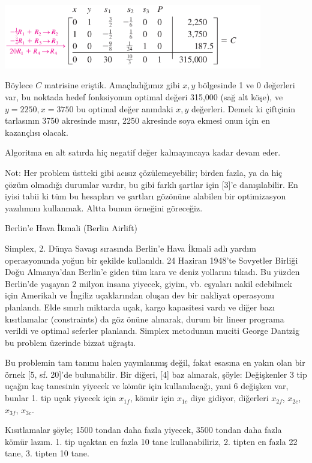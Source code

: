 \documentclass[12pt,fleqn]{article}\usepackage{../../common}
\begin{document}
\includegraphics[height=2.8cm]{func_simplex_08.png}

Böylece $C$ matrisine eriştik. Amaçladığımız gibi $x,y$ bölgesinde 1 ve 0
değerleri var, bu noktada hedef fonksiyonun optimal değeri 315,000 (sağ alt
köşe), ve $y=2250, x=3750$ bu optimal değer anındaki $x,y$ değerleri. Demek ki
çiftçinin tarlasının 3750 akresinde mısır, 2250 akresinde soya ekmesi onun için
en kazançlısı olacak.

Algoritma en alt satırda hiç negatif değer kalmayıncaya kadar devam eder. 

Not: Her problem üstteki gibi acısız çözülemeyebilir; birden fazla, ya da hiç
çözüm olmadığı durumlar vardır, bu gibi farklı şartlar için [3]'e
danışılabilir. En iyisi tabii ki tüm bu hesapları ve şartları gözönüne alabilen
bir optimizasyon yazılımını kullanmak. Altta bunun örneğini göreceğiz.

Berlin'e Hava İkmali (Berlin Airlift)

Simplex, 2. Dünya Savaşı sırasında Berlin'e Hava İkmali adlı yardım
operasyonunda yoğun bir şekilde kullanıldı. 24 Haziran 1948'te Sovyetler Birliği
Doğu Almanya'dan Berlin'e giden tüm kara ve deniz yollarını tıkadı. Bu yüzden
Berlin'de yaşayan 2 milyon insana yiyecek, giyim, vb. eşyaları nakil edebilmek
için Amerikalı ve İngiliz uçaklarından oluşan dev bir nakliyat operasyonu
planlandı. Elde sınırlı miktarda uçak, kargo kapasitesi vardı ve diğer bazı
kısıtlamalar (constraints) da göz önüne alınarak, durum bir lineer programa
verildi ve optimal seferler planlandı. Simplex metodunun muciti George Dantzig
bu problem üzerinde bizzat uğraştı.

Bu problemin tam tanımı halen yayınlanmış değil, fakat esasına en yakın olan bir
örnek [5, sf. 20]'de bulunabilir. Bir diğeri, [4] baz alınarak, şöyle:
Değişkenler 3 tip uçağın kaç tanesinin yiyecek ve kömür için kullanılacağı, yani
6 değişken var, bunlar 1. tip uçak yiyecek için $x_{1f}$, kömür için $x_{1c}$
diye gidiyor, diğerleri $x_{2f}$, $x_{2c}$, $x_{3f}$, $x_{3c}$.

Kısıtlamalar şöyle; 1500 tondan daha fazla yiyecek, 3500 tondan daha fazla kömür
lazım. 1. tip uçaktan en fazla 10 tane kullanabiliriz, 2. tipten en fazla 22
tane, 3. tipten 10 tane. 
\end{document}
